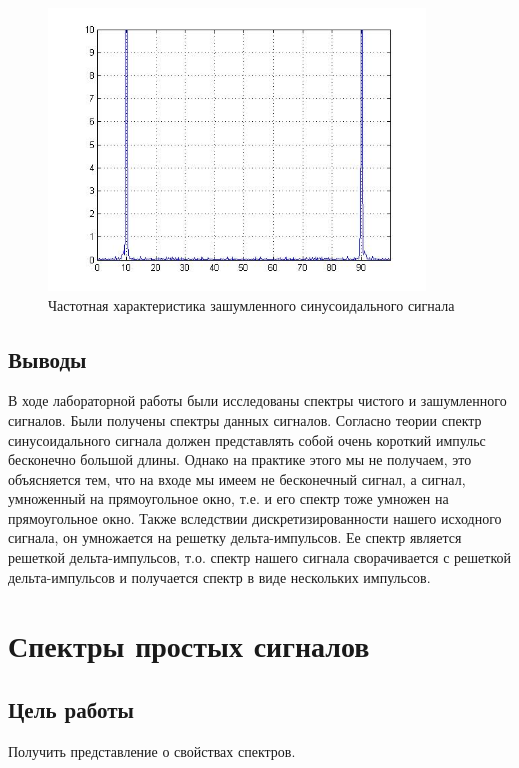 \documentclass[10pt,a4paper]{article}
\begin{document}
\newpage
\begin{figure}[h]
\centering
\includegraphics[width=10cm]{4.jpg} 
\caption{Частотная характеристика зашумленного синусоидального сигнала} 
\label{fig.3} 
\end{figure}

\subsection{Выводы}
\newpage
В ходе лабораторной работы были исследованы спектры чистого и зашумленного сигналов. Были получены спектры данных сигналов. Согласно теории спектр синусоидального сигнала должен представлять собой очень короткий импульс бесконечно большой длины. Однако на практике этого мы не получаем, это объясняется тем, что на входе мы имеем не бесконечный сигнал, а сигнал, умноженный на прямоугольное окно, т.е. и его спектр тоже умножен на прямоугольное окно. Также вследствии дискретизированности нашего исходного сигнала, он умножается на решетку дельта-импульсов. Ее спектр является решеткой дельта-импульсов, т.о. спектр нашего сигнала сворачивается с решеткой дельта-импульсов и получается спектр в виде нескольких импульсов.

\newpage
\section{Спектры простых сигналов}
\subsection{Цель работы}
Получить представление о свойствах спектров.
\end{document}
